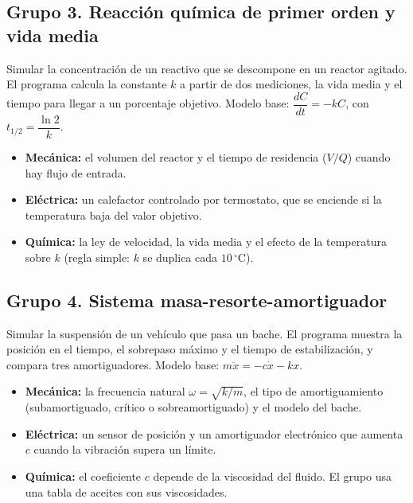 \documentclass[doc]{apa6}
\begin{document}
\subsection*{Grupo 3. Reacción química de primer orden y vida media}
Simular la concentración de un reactivo que se descompone en un reactor agitado. El programa calcula la constante $k$ a partir de dos mediciones, la vida media y el tiempo para llegar a un porcentaje objetivo. Modelo base: $\dfrac{dC}{dt}=-kC$, con $t_{1/2}=\dfrac{\ln 2}{k}$.
\begin{itemize}
    \item \textbf{Mecánica:} el volumen del reactor y el tiempo de residencia ($V/Q$) cuando hay flujo de entrada.
    \item \textbf{Eléctrica:} un calefactor controlado por termostato, que se enciende si la temperatura baja del valor objetivo.
    \item \textbf{Química:} la ley de velocidad, la vida media y el efecto de la temperatura sobre $k$ (regla simple: $k$ se duplica cada $10\,^\circ$C).
\end{itemize}

\subsection*{Grupo 4. Sistema masa-resorte-amortiguador}
Simular la suspensión de un vehículo que pasa un bache. El programa muestra la posición en el tiempo, el sobrepaso máximo y el tiempo de estabilización, y compara tres amortiguadores. Modelo base: $m\ddot{x}=-c\dot{x}-kx$.
\begin{itemize}
    \item \textbf{Mecánica:} la frecuencia natural $\omega=\sqrt{k/m}$, el tipo de amortiguamiento (subamortiguado, crítico o sobreamortiguado) y el modelo del bache.
    \item \textbf{Eléctrica:} un sensor de posición y un amortiguador electrónico que aumenta $c$ cuando la vibración supera un límite.
    \item \textbf{Química:} el coeficiente $c$ depende de la viscosidad del fluido. El grupo usa una tabla de aceites con sus viscosidades.
\end{itemize}
\end{document}
